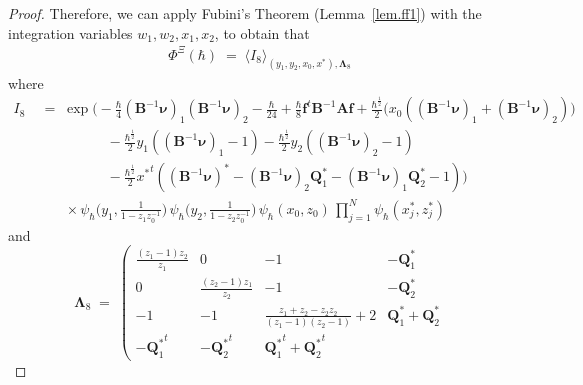 \documentclass[12pt,reqno]{amsart}
\theoremstyle{definition}
\def\mbfQ{\mathbf Q}
\newcommand{\bea}{\begin{equation}\begin{aligned}}
\newcommand{\eea}{\end{aligned}\end{equation}}
\renewcommand{\=}{\;=\;}
\newcommand{\hsqrt}{\hbar^{\frac{1}{2}}}
\begin{document}
\begin{proof}
Therefore, we can apply Fubini's Theorem (Lemma~\ref{lem.ff1}) with the
integration variables $w_1,w_2,x_1,x_2$,
to obtain that
\bea
\Phi^{\Xi}(\hbar) \=
\langle I_8 \rangle_{(y_1,y_2,x_0,x^*),
\mathbf \Lambda_8}
\eea
where
\begin{align*}
I_8 &\= \exp\Big(-\frac{\hbar}{4}(\mathbf B^{-1}\boldsymbol{\nu})_1
(\mathbf B^{-1}\boldsymbol{\nu})_2-\frac{\hbar}{24}
+\frac\hbar8 \mathbf f^t \mathbf B^{-1} \mathbf A \mathbf f
+\frac{\hsqrt}2\big(
x_0\left((\mathbf B^{-1}\boldsymbol{\nu})_1
 +(\mathbf B^{-1}\boldsymbol{\nu})_2\right)\big)\\
&\qquad\qquad\quad
-\frac{\hsqrt}2y_1\left((\mathbf B^{-1}\boldsymbol{\nu})_1-1\right)
-\frac{\hsqrt}2y_2\left((\mathbf B^{-1}\boldsymbol{\nu})_2-1\right)\\
&\qquad\qquad\quad
-\frac{\hsqrt}2{x^*}^t\left((\mathbf B^{-1}\boldsymbol{\nu})^*-
 (\mathbf B^{-1}\boldsymbol{\nu})_2\mbfQ_1^*
 -(\mathbf B^{-1}\boldsymbol{\nu})_1\mbfQ_2^*-1\right)\Big)\\
&\qquad\times\psi_\hbar\Big(y_1,
\frac 1 {1-z_1z_0^{-1}}\Big)\,
\psi_\hbar\Big(y_2,
\frac 1 {1-z_2z_0^{-1}}\Big)\,
\psi_\hbar(x_0,z_0)\,
\prod_{j=1}^{N} \psi_{\hbar}( x_j^*, z_j^*)
\end{align*}
and
\[
\mathbf \Lambda_8 \=
\left(\!\!
\begin{array}{ccc|c}
 \frac{({z_1}-1) {z_2}}{{z_1}} & 0 & -1 & -{\mbfQ_1^*} \\
 0 & \frac{({z_2}-1){z_1} }{{z_2}} & -1 & -{\mbfQ_2^*} \\
 -1 & -1 & \frac{{z_1}+{z_2}-z_2z_2}{({z_1}-1) ({z_2}-1)}+2 &
   {\mbfQ_1^*}+{\mbfQ_2^*} \\
   \hline
 -{\mbfQ_1^*}^t & -{\mbfQ_2^*}^t & {\mbfQ_1^*}^t+{\mbfQ_2^*}^t &

\end{array}\]
\end{proof}
\end{document}

